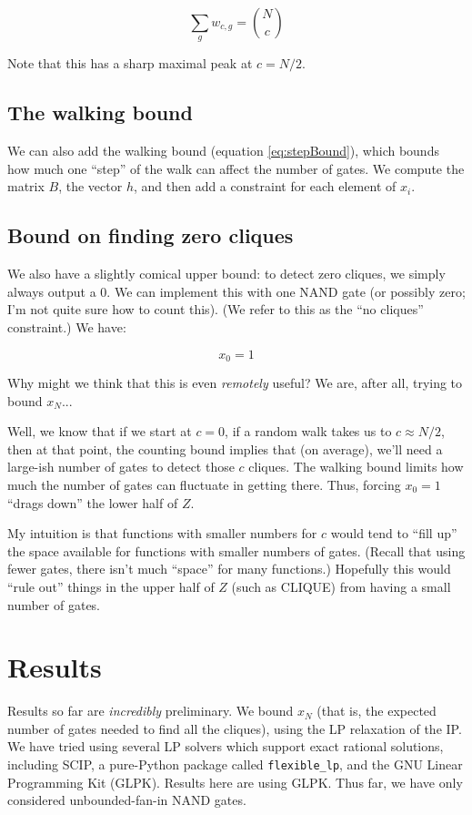 \documentclass[12pt]{article}
\theoremstyle{definition}
\begin{document}
\[
\sum_g w_{c,g} = {N \choose c}
\]

Note that this has a sharp maximal peak at $c = N/2$.

\subsection{The walking bound}

We can also add the walking bound (equation \ref{eq:stepBound}), which bounds how much
one ``step'' of the walk can affect the number of gates.
We compute the matrix $B$, the vector $h$, and then add a constraint for each element of $x_i$.

\subsection{Bound on finding zero cliques}

We also have a slightly comical upper bound:
to detect zero cliques, we simply always
output a 0. We can implement this with one NAND gate (or possibly zero;
I'm not quite sure how to count this). (We refer to this as the
``no cliques'' constraint.) We have:

\[
x_0 = 1
\]

Why might we think that this is even {\em remotely} useful? We are, after
all, trying to bound $x_N$...

Well, we know that if we start at $c=0$, if a random walk takes us to
$c \approx N/2$, then at that point, the counting bound implies that
(on average), we'll need a large-ish number of gates to detect those $c$ cliques.
The walking bound limits how much the number of gates can fluctuate
in getting there. Thus, forcing $x_0=1$ ``drags down'' the lower half of $Z$.

My intuition is that functions with smaller numbers for $c$ would
tend to ``fill up'' the space available for functions with smaller numbers of gates.
(Recall that using fewer gates, there isn't much ``space'' for many functions.)
Hopefully this would ``rule out'' things in the upper half of $Z$ (such as CLIQUE)
from having a small number of gates.

\section{Results}

Results so far are {\em incredibly} preliminary. We bound $x_N$
(that is, the expected number of gates needed to find all the cliques),
using the LP relaxation of the IP. We have tried using several
LP solvers which support exact rational solutions,
including SCIP, a pure-Python package called {\tt flexible\_lp},
and the GNU Linear Programming Kit (GLPK). Results here are
using GLPK. Thus far, we have only considered unbounded-fan-in
NAND gates.
\end{document}
